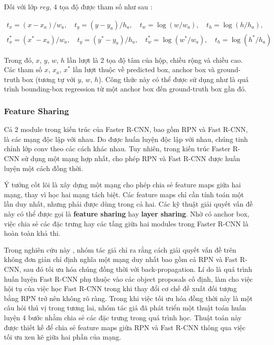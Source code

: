 
\newpage

Đối với lớp $reg$, 4 tọa độ được tham số như sau \cite{girshick2014rich}:

\vspace{-1cm}
\begin{gather*}
	t_x = (x - x_a)/w_a, \quad t_y = (y - y_a)/h_a, \quad t_w = \log(w/w_a), \quad t_h=\log(h/h_a), \\
	t_x^* = (x^* - x_a)/w_a, \quad t_y = (y^* - y_a)/h_a, \quad t_w^* = \log(w^*/w_a), \quad t_h=\log(h^*/h_a)
\end{gather*}
\vspace{-1cm}

Trong đó, $x$, $y$, $w$, $h$ lần lượt là 2 tọa độ tâm của hộp, chiều rộng và chiều cao. Các tham số $x$, $x_a$, $x^*$ lần lượt thuộc về predicted box, anchor box và ground-truth box (tương tự với $y$, $w$, $h$). Công thức này có thể được sử dụng như là quá trình bounding-box regression từ một anchor box đến ground-truth box gần đó.

\subsubsection*{Feature Sharing}
Cả 2 module trong kiến trúc của Faster R-CNN, bao gồm RPN và Fast R-CNN, là các mạng độc lập với nhau. Do được huấn luyện độc lập với nhau, chúng tinh chỉnh lớp conv theo các cách khác nhau. Tuy nhiên, trong kiến trúc Faster R-CNN sử dụng một mạng hợp nhất, cho phép RPN và Fast R-CNN được huấn luyện một cách đồng thời.

Ý tưởng cốt lõi là xây dựng một mạng cho phép chia sẻ feature maps giữa hai mạng, thay vì học hai mạng tách biệt. Các feature maps chỉ cần tính toán một lần duy nhất, nhưng phải được dùng trong cả hai. Các kỹ thuật giải quyết vấn đề này có thể được gọi là \textbf{feature sharing} hay \textbf{layer sharing}. Nhờ có anchor box, việc chia sẻ các đặc trưng hay các tầng giữa hai modules trong Faster R-CNN là hoàn toàn khả thi.

Trong nghiên cứu này \citep{Girshick_2015_ICCV}, nhóm tác giả chỉ ra rằng cách giải quyết vấn đề trên không đơn giản chỉ định nghĩa một mạng duy nhất bao gồm cả RPN và Fast R-CNN, sau đó tối ưu hóa chúng đồng thời với back-propagation. Lí do là quá trình huấn luyện Fast R-CNN phụ thuộc vào các object proposals cố định, làm cho việc hội tụ của việc học Fast R-CNN trong khi thay đổi cơ chế đề xuất đối tượng bằng RPN trở nên không rõ ràng. Trong khi việc tối ưu hóa đồng thời này là một câu hỏi thú vị trong tương lai, nhóm tác giả đã phát triển một thuật toán huấn luyện 4 bước nhằm chia sẻ các đặc trưng trong quá trình học. Thuật toán này được thiết kế để chia sẻ feature maps giữa RPN và Fast R-CNN thông qua việc tối ưu xen kẽ giữa hai phần của mạng.

